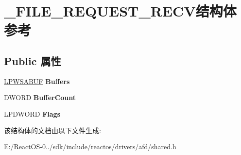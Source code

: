 \hypertarget{struct___f_i_l_e___r_e_q_u_e_s_t___r_e_c_v}{}\section{\+\_\+\+F\+I\+L\+E\+\_\+\+R\+E\+Q\+U\+E\+S\+T\+\_\+\+R\+E\+C\+V结构体 参考}
\label{struct___f_i_l_e___r_e_q_u_e_s_t___r_e_c_v}
\subsection*{Public 属性}
\begin{DoxyCompactItemize}
\item 
\mbox{\label{struct___f_i_l_e___r_e_q_u_e_s_t___r_e_c_v_a9dc02cad8e99667641bf9ad980c1b28d}} 
\hyperlink{struct___w_s_a_b_u_f}{L\+P\+W\+S\+A\+B\+UF} {\bfseries Buffers}
\item 
\mbox{\label{struct___f_i_l_e___r_e_q_u_e_s_t___r_e_c_v_a21ee7aea9b00d7549744b6faa08db6d4}} 
D\+W\+O\+RD {\bfseries Buffer\+Count}
\item 
\mbox{\label{struct___f_i_l_e___r_e_q_u_e_s_t___r_e_c_v_a5500dae02898e4eb02566f36ace3809c}} 
L\+P\+D\+W\+O\+RD {\bfseries Flags}
\end{DoxyCompactItemize}


该结构体的文档由以下文件生成\+:\begin{DoxyCompactItemize}
\item 
E\+:/\+React\+O\+S-\/0../sdk/include/reactos/drivers/afd/shared.\+h\end{DoxyCompactItemize}
